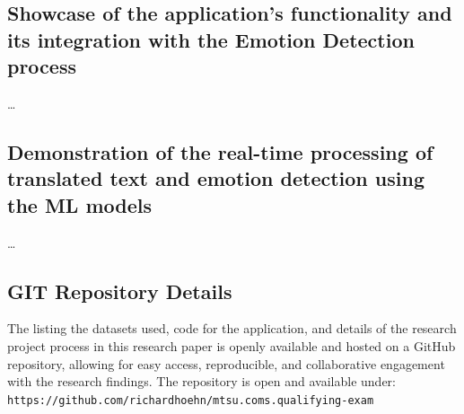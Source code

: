 \documentclass[11pt]{article}
\begin{document}
\subsection{Showcase of the application's functionality and its integration with the Emotion Detection process}
\ldots

\subsection{Demonstration of the real-time processing of translated text and emotion detection using the ML models}
\ldots

\subsection{GIT Repository Details}
The listing the datasets used, code for the application, and details of the research project process in this research paper is openly available and hosted on a GitHub repository, allowing for easy access, reproducible, and collaborative engagement with the research findings. The repository is open and available under: \texttt{https://github.com/richardhoehn/mtsu.coms.qualifying-exam}\cite{Hoehn_Improving_Emotion_Detection_2023}
\clearpage


\printbibliography
\clearpage


\listoffigures
\clearpage

\appendix
\end{document}
